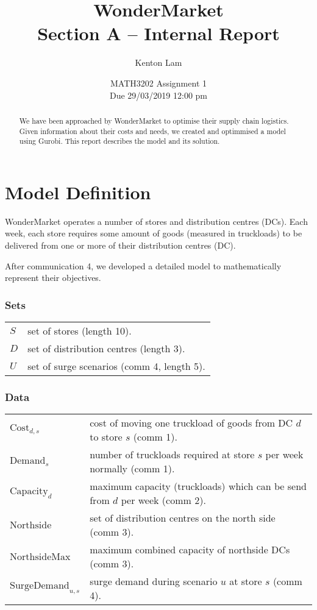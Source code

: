 \documentclass[11pt,a4paper]{article}
\author{Kenton Lam}
\date{{MATH3202 Assignment 1 \\ Due 29/03/2019 12:00 pm}}
\title{WonderMarket \\ Section A -- Internal Report}
\begin{document}
\maketitle
\begin{abstract}
    We have been approached by WonderMarket to optimise their supply chain logistics.
    Given information about their costs and needs, we created and optimmised a model using Gurobi.
    This report describes the model and its solution.
\end{abstract}

\part{Model Definition}
WonderMarket operates a number of stores and distribution centres (DCs).
Each week, each store requires some amount of goods (measured in truckloads)
to be delivered from one or more of their distribution centres (DC).

After communication 4, we developed a detailed model to mathematically represent
their objectives.

\section{Sets}
\begin{tabular}{l l}
    $S$ & set of stores (length 10). \\ 
    $D$ & set of distribution centres (length 3). \\ 
    $U$ & set of surge scenarios (comm 4, length 5).   
\end{tabular}

\section{Data}
\begin{tabular}{l l}
    $\mathrm{Cost}_{d,s}$ & cost of moving one truckload of goods from DC $d$ to store $s$ (comm 1). \\ 
    $\mathrm{Demand}_s$ & number of truckloads required at store $s$ per week normally (comm 1). \\
    $\mathrm{Capacity}_d$ & maximum capacity (truckloads) which can be send from $d$ per week (comm 2). \\ 
    $\mathrm{Northside}$ & set of distribution centres on the north side (comm 3). \\ 
    $\mathrm{NorthsideMax}$ & maximum combined capacity of northside DCs (comm 3). \\ 
    $\mathrm{SurgeDemand}_{u,s}$ & surge demand during scenario $u$ at store $s$ (comm 4).
\end{tabular}
\end{document}
